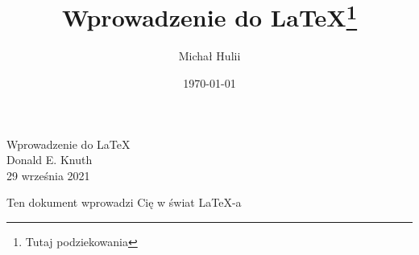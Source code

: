 \documentclass{article}
\author{Michał Hulii}
\title{Wprowadzenie do \LaTeX \thanks{Tutaj podziekowania}}
\date{\today}
\begin{document}
	\mbox{}
	\vfill
	\begin{center}
		Wprowadzenie do \LaTeX * \\
		Donald E. Knuth \\
		29 września 2021
	\end{center}
	\newpage
	Ten dokument wprowadzi Cię w świat \LaTeX -a
\end{document}
